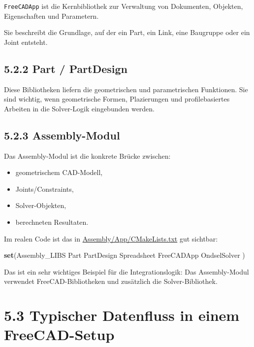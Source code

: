 \documentclass[
  12pt
]{book}
\newenvironment{Shaded}{}{}
\newcommand{\KeywordTok}[1]{\textcolor[rgb]{0.00,0.44,0.13}{\textbf{#1}}}
\newcommand{\NormalTok}[1]{#1}
\providecommand{\tightlist}{%
  \setlength{\itemsep}{0pt}\setlength{\parskip}{0pt}}
\begin{document}
\texttt{FreeCADApp} ist die Kernbibliothek zur Verwaltung von
Dokumenten, Objekten, Eigenschaften und Parametern.

Sie beschreibt die Grundlage, auf der ein Part, ein Link, eine Baugruppe
oder ein Joint entsteht.

\hypertarget{part-partdesign}{%
\subsection{\texorpdfstring{{5.2.2} Part /
PartDesign}{5.2.2 Part / PartDesign}}\label{part-partdesign}}

Diese Bibliotheken liefern die geometrischen und parametrischen
Funktionen. Sie sind wichtig, wenn geometrische Formen, Plazierungen und
profilebasiertes Arbeiten in die Solver-Logik eingebunden werden.

\hypertarget{assembly-modul}{%
\subsection{\texorpdfstring{{5.2.3}
Assembly-Modul}{5.2.3 Assembly-Modul}}\label{assembly-modul}}

Das Assembly-Modul ist die konkrete Brücke zwischen:

\begin{itemize}
\tightlist
\item
  geometrischem CAD-Modell,
\item
  Joints/Constraints,
\item
  Solver-Objekten,
\item
  berechneten Resultaten.
\end{itemize}

Im realen Code ist das in
\href{https://github.com/FreeCAD/FreeCAD/blob/main/src/Mod/Assembly/App/CMakeLists.txt}{Assembly/App/CMakeLists.txt}
gut sichtbar:

\begin{Shaded}
\begin{Highlighting}[]
\KeywordTok{set}\NormalTok{(Assembly\_LIBS}
\NormalTok{    Part}
\NormalTok{    PartDesign}
\NormalTok{    Spreadsheet}
\NormalTok{    FreeCADApp}
\NormalTok{    OndselSolver}
\NormalTok{)}
\end{Highlighting}
\end{Shaded}

Das ist ein sehr wichtiges Beispiel für die Integrationslogik: Das
Assembly-Modul verwendet FreeCAD-Bibliotheken und zusätzlich die
Solver-Bibliothek.

\hypertarget{typischer-datenfluss-in-einem-freecad-setup}{%
\section{\texorpdfstring{{5.3} Typischer Datenfluss in einem
FreeCAD-Setup}{5.3 Typischer Datenfluss in einem FreeCAD-Setup}}\label{typischer-datenfluss-in-einem-freecad-setup}}
\end{document}
